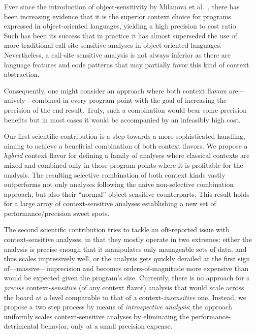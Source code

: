 Ever since the introduction of object-sensitivity by Milanova et al.~\cite{issta:2002:Milanova}, there has been increasing evidence that it is the superior context choice for programs expressed in object-oriented languages, yielding a high precision to cost ratio. Such has been its success that in practice it has almost superseded the use of more traditional call-site sensitive analyses in object-oriented languages. Nevertheless, a call-site sensitive analysis is not always inferior as there are language features and code patterns that may partially favor this kind of context abstraction.

Consequently, one might consider an approach where both context flavors are---naively---combined in every program point with the goal of increasing the precision of the end result. Truly, such a combination would bear some precision benefits but in most cases it would be accompanied by an infeasibly high cost.

 Our first scientific contribution is a step towards a more sophisticated handling, aiming to achieve a beneficial combination of both context flavors. We propose a \emph{hybrid} context flavor for defining a family of analyses where classical contexts are mixed and combined only in those program points where it is profitable for the analysis. The resulting selective combination of both context kinds vastly outperforms not only analyses following the naive non-selective combination approach, but also their ``normal'' object-sensitive counterparts. This result holds for a large array of context-sensitive analyses establishing a new set of performance/precision sweet spots.

 The second scientific contribution tries to tackle an oft-reported issue with context-sensitive analyses, in that they mostly operate in two extremes: either the analysis is precise enough that it manipulates only manageable sets of data, and thus scales impressively well, or the analysis gets quickly derailed at the first sign of---massive---imprecision and becomes orders-of-magnitude more expensive than would be expected given the program's size. Currently, there is no approach for a \emph{precise} context-\emph{sensitive} (of any context flavor) analysis that would scale across the board at a level comparable to that of a context-\emph{insensitive} one. Instead, we propose a two step process by means of \emph{introspective analysis}: the approach uniformly scales context-sensitive analyses by eliminating the performance-detrimental behavior, only at a small precision expense.

